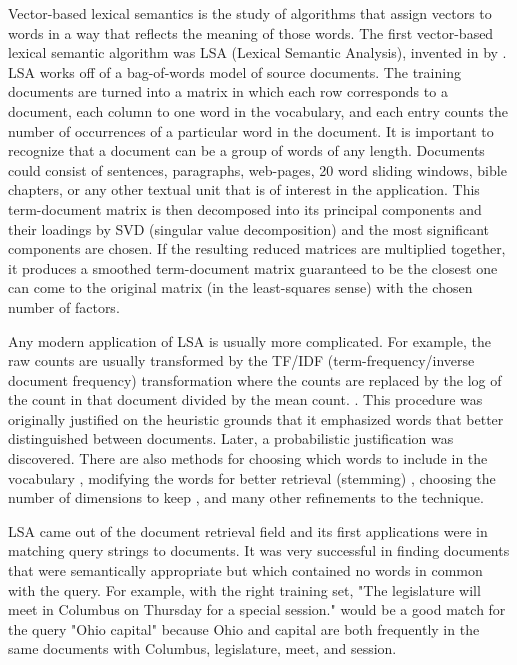 \documentclass[eric_thesis.tex]{subfiles}
\begin{document}
Vector-based lexical semantics is the study of algorithms that assign vectors to words in a way that reflects the meaning of those words. The first vector-based lexical semantic algorithm was LSA (Lexical Semantic Analysis), invented in  by . LSA works off of a bag-of-words model of source documents. The training documents are turned into a matrix in which each row corresponds to a document, each column to one word in the vocabulary, and each entry counts the number of occurrences of a particular word in the document. It is important to recognize that a document can be a group of words of any length. Documents could consist of sentences, paragraphs, web-pages, 20 word sliding windows, bible chapters, or any other textual unit that is of interest in the application. This term-document matrix is then decomposed into its principal components and their loadings by SVD (singular value decomposition) and the most significant components are chosen. If the resulting reduced matrices are multiplied together, it produces a smoothed term-document matrix guaranteed to be the closest one can come to the original matrix (in the least-squares sense) with the chosen number of factors.


Any modern application of LSA is usually more complicated. For example, the raw counts are usually transformed by the TF/IDF (term-frequency/inverse document frequency) transformation where the counts are replaced by the log of the count in that document divided by the mean count. . This procedure was originally justified on the heuristic grounds that it emphasized words that better distinguished between documents.  Later, a probabilistic justification was discovered.  There are also methods for choosing which words to include in the vocabulary , modifying the words for better retrieval (stemming) , choosing the number of dimensions to keep , and many other refinements to the technique.

LSA came out of the document retrieval field and its first applications were in matching query strings to documents. It was very successful in finding documents that were semantically appropriate but which contained no words in common with the query. For example, with the right training set, "The legislature will meet in Columbus on Thursday for a special session." would be a good match for the query "Ohio capital" because Ohio and capital are both frequently in the same documents with Columbus, legislature, meet, and session.
\end{document}
